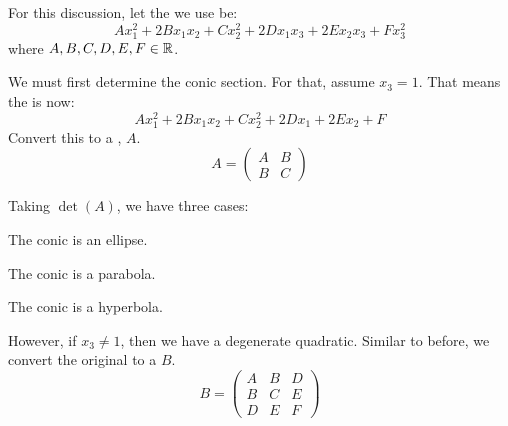 \begin{blackbox}
  For this discussion, let the  we use be:
  \begin{equation*}
    Ax_{1}^{2} + 2 Bx_{1}x_{2} + C x_{2}^{2} + 2 D x_{1}x_{3} + 2 E x_{2} x_{3} + F x_{3}^{2}
  \end{equation*}
  where $A,B,C,D,E,F \in \operatorname{\mathbb{R}}$.

  We must first determine the conic section.
  For that, assume $x_{3} = 1$.
  That means the  is now:
  \begin{equation*}
    Ax_{1}^{2} + 2 Bx_{1}x_{2} + C x_{2}^{2} + 2 D x_{1} + 2 E x_{2} + F
  \end{equation*}
  Convert this to a , $A$.
  \begin{equation*}
    A =
    \begin{pmatrix}
      A & B \\
      B & C
    \end{pmatrix}
  \end{equation*}

  Taking $\det(A)$, we have three cases:
  \begin{description}[noitemsep]
  \item[$\det(A) > 0$] The conic is an ellipse.
  \item[$\det(A) = 0$] The conic is a parabola.
  \item[$\det(A) < 0$] The conic is a hyperbola.
  \end{description}

  However, if $x_{3} \neq 1$, then we have a degenerate quadratic.
  Similar to before, we convert the original  to a  $B$.
  \begin{equation*}
    B = \begin{pmatrix}
      A & B & D \\
      B & C & E \\
      D & E & F
    \end{pmatrix}
  \end{equation*}


\end{blackbox}
